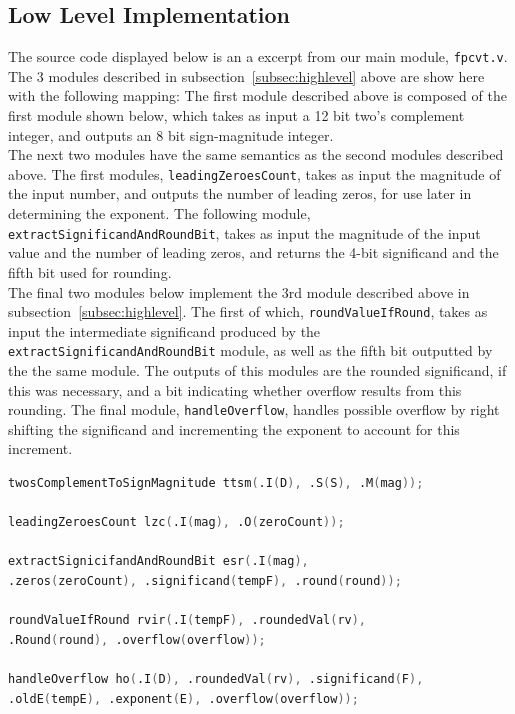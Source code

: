 \documentclass[]{article}
\begin{document}
\subsection{Low Level Implementation}

The source code displayed below is an a excerpt from our main module, \texttt{fpcvt.v}. The 3 modules described in subsection~\ref{subsec:highlevel} above are show here with the following mapping: The first module described above is composed of the first module shown below, which takes as input a 12 bit two's complement integer, and outputs an 8 bit sign-magnitude integer.\\

The next two modules have the same semantics as the second modules described above. The first modules, \texttt{leadingZeroesCount}, takes as input the magnitude of the input number, and outputs the number of leading zeros, for use later in determining the exponent. The following module, \texttt{extractSignificandAndRoundBit}, takes as input the magnitude of the input value and the number of leading zeros, and returns the 4-bit significand and the fifth bit used for rounding.\\

The final two modules below implement the 3rd module described above in subsection~\ref{subsec:highlevel}. The first of which, \texttt{roundValueIfRound}, takes as input the intermediate significand produced by the \texttt{extractSignificand\-AndRoundBit} module, as well as the fifth bit outputted by the the same module. The outputs of this modules are the rounded significand, if this was necessary, and a bit indicating whether overflow results from this rounding. The final module, \texttt{handleOverflow}, handles possible overflow by right shifting the significand and incrementing the exponent to account for this increment.

\begin{lstlisting}[frame=single, language=verilog, caption= Excerpt from main \texttt{fpcvt.v} module.]
twosComplementToSignMagnitude ttsm(.I(D), .S(S), .M(mag));
    
leadingZeroesCount lzc(.I(mag), .O(zeroCount));
    
extractSignicifandAndRoundBit esr(.I(mag), 
.zeros(zeroCount), .significand(tempF), .round(round));

roundValueIfRound rvir(.I(tempF), .roundedVal(rv), 
.Round(round), .overflow(overflow));

handleOverflow ho(.I(D), .roundedVal(rv), .significand(F), 
.oldE(tempE), .exponent(E), .overflow(overflow));
\end{lstlisting}
\end{document}
